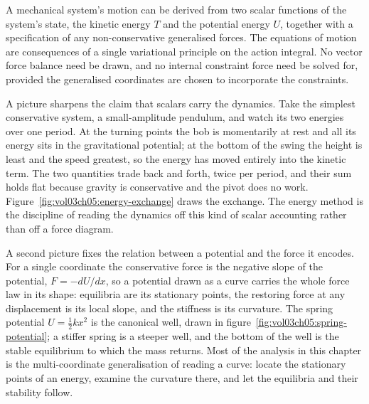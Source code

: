 \begin{principle}
A mechanical system's motion can be derived from two scalar
functions of the system's state, the kinetic energy $T$ and the
potential energy $U$, together with a specification of any
non-conservative generalised forces. The equations of motion are
consequences of a single variational principle on the action
integral. No vector force balance need be drawn, and no internal
constraint force need be solved for, provided the generalised
coordinates are chosen to incorporate the constraints.
\end{principle}

A picture sharpens the claim that scalars carry the dynamics. Take the
simplest conservative system, a small-amplitude pendulum, and watch its
two energies over one period. At the turning points the bob is
momentarily at rest and all its energy sits in the gravitational
potential; at the bottom of the swing the height is least and the speed
greatest, so the energy has moved entirely into the kinetic term. The
two quantities trade back and forth, twice per period, and their sum
holds flat because gravity is conservative and the pivot does no work.
Figure~\ref{fig:vol03ch05:energy-exchange} draws the exchange. The
energy method is the discipline of reading the dynamics off this kind
of scalar accounting rather than off a force diagram.



A second picture fixes the relation between a potential and the force
it encodes. For a single coordinate the conservative force is the
negative slope of the potential, $F = -dU/dx$, so a potential drawn as
a curve carries the whole force law in its shape: equilibria are its
stationary points, the restoring force at any displacement is its local
slope, and the stiffness is its curvature. The spring potential
$U = \tfrac12 k x^2$ is the canonical well, drawn in
figure~\ref{fig:vol03ch05:spring-potential}; a stiffer spring is a
steeper well, and the bottom of the well is the stable equilibrium to
which the mass returns. Most of the analysis in this chapter is the
multi-coordinate generalisation of reading a curve: locate the
stationary points of an energy, examine the curvature there, and let
the equilibria and their stability follow.



